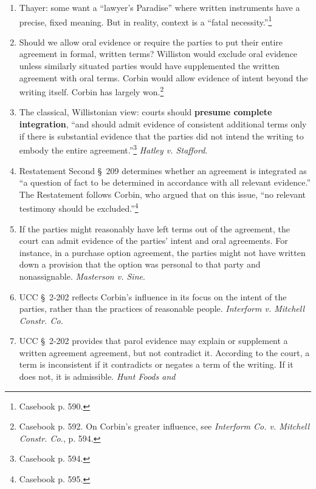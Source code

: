 \begin{enumerate}
    \item Thayer: some want a ``lawyer's Paradise'' where written instruments 
    have a precise, fixed meaning. But in reality, context is a ``fatal 
    necessity.''\footnote{Casebook p. 590.} 
    \item Should we allow oral evidence or require the parties to put their 
    entire agreement in formal, written terms? Williston would exclude oral 
    evidence unless similarly situated parties would have supplemented the 
    written agreement with oral terms. Corbin would allow evidence of intent 
    beyond the writing itself. Corbin has largely won.\footnote{Casebook p. 
    592. On Corbin's greater influence, see \emph{Interform Co. v. Mitchell 
    Constr. Co.}, p. 594.}
    \item The classical, Willistonian view: courts should \textbf{presume 
    complete integration}, ``and should admit evidence of consistent 
    additional terms only if there is substantial evidence that the parties 
    did not intend the writing to embody the entire 
    agreement.''\footnote{Casebook p. 594.} \emph{Hatley v. Stafford}.
    \item Restatement Second \S\ 209 determines whether an agreement is 
    integrated as ``a question of fact to be determined in accordance with all 
    relevant evidence.'' The Restatement follows Corbin, who argued that on 
    this issue, ``no relevant testimony should be 
    excluded.''\footnote{Casebook p. 595.}
    \item If the parties might reasonably have left terms out of the 
    agreement, the court can admit evidence of the parties' intent and oral 
    agreements. For instance, in a purchase option agreement, the parties 
    might not have written down a provision that the option was personal to 
    that party and nonassignable. \emph{Masterson v. Sine}.
    \item UCC \S\ 2-202 reflects Corbin's influence in its focus on the intent 
    of the parties, rather than the practices of reasonable people. 
    \emph{Interform v. Mitchell Constr. Co.}
    \item UCC \S\ 2-202 provides that parol evidence may explain or supplement 
    a written agreement agreement, but not contradict it. According to the 
    court, a term is inconsistent if it contradicts or negates a term of the 
    writing. If it does not, it is admissible. \emph{Hunt Foods and 
}
\end{enumerate}
